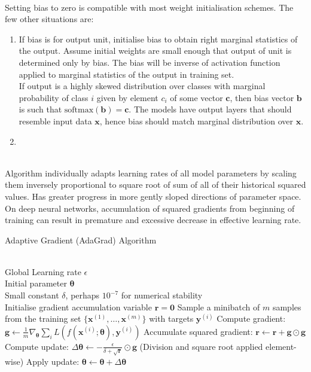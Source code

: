 \begin{remark} \\
Setting bias to zero is compatible with most weight initialisation schemes. The few other situations are:
\begin{enumerate}[label=\roman*.]
\setlength{\itemsep}{0pt}
\item If bias is for output unit, initialise bias to obtain right marginal statistics of the output. Assume initial weights are small enough that output of unit is determined only by bias. The bias will be inverse of activation function applied to marginal statistics of the output in training set.\\
If output is a highly skewed distribution over classes with marginal probability of class $i$ given by element $c_i$ of some vector $\bm{c}$, then bias vector $\bm{b}$ is such that $\text{softmax}(\bm{b}) = \bm{c}$. The models have output layers that should resemble input data $\bm{x}$, hence bias should match marginal distribution over $\bm{x}$.
\item 
\end{enumerate}
\end{remark}


\begin{remark} \\
Algorithm individually adapts learning rates of all model parameters by scaling them inversely proportional to square root of sum of all of their historical squared values. Has greater progress in more gently sloped directions of parameter space. On deep neural networks, accumulation of squared gradients from beginning of training can result in premature and excessive decrease in effective learning rate.
\end{remark}

\begin{breakablealgorithm}
\caption{Adaptive Gradient (AdaGrad) Algorithm}
\begin{algorithmic}
\Require \\
Global Learning rate $\epsilon$\\
Initial parameter $\bm{\theta}$\\
Small constant $\delta$, perhaps $10^{-7}$ for numerical stability\\

\State Initialise gradient accumulation variable $\bm{r} = \bm{0}$
\State Sample a minibatch of $m$ samples from the training set $\{\bm{x}^{(1)}, \ldots, \bm{x}^{(m)} \}$ with targets $\bm{y}^{(i)}$
\State Compute gradient: $\bm{g} \leftarrow \frac{1}{m} \nabla_{\bm{\theta}} \sum_i L(f(\bm{x}^{(i)}; \bm{\theta}), \bm{y}^{(i)})$
\State Accumulate squared gradient: $\bm{r} \leftarrow \bm{r} + \bm{g} \odot \bm{g}$
\State Compute update: $\Delta \bm{\theta} \leftarrow - \frac{\epsilon}{\delta + \sqrt{\bm{r}}} \odot \bm{g}$ (Division and square root applied element-wise)
\State Apply update: $\bm{\theta} \leftarrow \bm{\theta} + \Delta \bm{\theta}$
\EndWhile
\end{algorithmic}
\end{breakablealgorithm}

